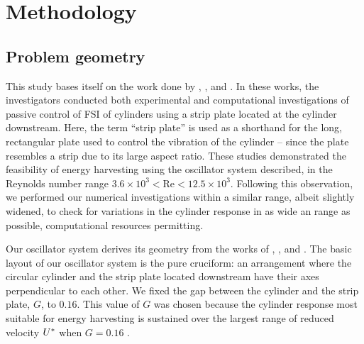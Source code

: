 \documentclass[oneside]{utmthesis}
\begin{document}

\chapter{Methodology} \label{chap:method}
\section{Problem geometry} \label{sec:probGeo}
This study bases itself on the work done by \citet{Maruai2017}, \citet{Maruai2018}, and \citet{Koide2013}. In these works, the investigators conducted both experimental and computational investigations of passive control of FSI of cylinders using a strip plate located at the cylinder downstream. Here, the term ``strip plate'' is used as a shorthand for the long, rectangular plate used to control the vibration of the cylinder -- since the plate resembles a strip due to its large aspect ratio. These studies demonstrated the feasibility of energy harvesting using the oscillator system described, in the Reynolds number range $3.6\times10^{3}<\text{Re}<12.5\times10^{3}$. Following this observation, we performed our numerical investigations within a similar \re{} range, albeit slightly widened, to check for variations in the cylinder response in as wide an \re{} range as possible, computational resources permitting.

Our oscillator system derives its geometry from the works of \citet{Nguyen2012}, \citet{Koide2013}, and \citet{Koide2017}. The basic layout of our oscillator system is the pure cruciform: an arrangement where the circular cylinder and the strip plate located downstream have their axes perpendicular to each other. We fixed the gap between the cylinder and the strip plate, $G$, to $0.16$. This value of $G$ was chosen because the cylinder response most suitable for energy harvesting is sustained over the largest range of reduced velocity $U^{*}$ when $G = 0.16$ \citep{Koide2013}.
\end{document}
